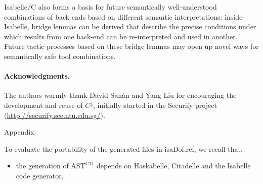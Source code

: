 \begin{isabellebody}
\begin{isamarkuptext}
Isabelle/C also forms a basis for future semantically well-understood combinations of back-ends 
based on different semantic interpretations: inside Isabelle, bridge lemmas can be derived 
that describe the precise conditions under which results from one back-end can be re-interpreted
and used in another. Future tactic processes based on these bridge lemmas may open up novel ways 
for semantically safe tool combinations.%
\end{isamarkuptext}\isamarkuptrue%
%
\paragraph*{Acknowledgments.}
\begin{isamarkuptext}%
The authors warmly thank David Sanán and Yang Liu for encouraging the development and reuse of
$C^\downarrow$, initially started in the Securify project \cite{DBLP:conf/tacas/SananZHZTL17}
(\url{http://securify.sce.ntu.edu.sg/}).
\end{isamarkuptext}\isamarkuptrue%
%
\begin{isamarkupsection*}%
[label = {appendix},type = {scholarly_paper.technical}, args={label = {appendix},type = {scholarly_paper.technical}, scholarly_paper.text_section.main_author = {@{docitem ''fred''}}, Isa_COL.text_element.level = {}, Isa_COL.text_element.referentiable = {False}, Isa_COL.text_element.variants = {{STR ''outline'', STR ''document''}}, scholarly_paper.text_section.fixme_list = {}, Isa_COL.text_element.level = {}, scholarly_paper.technical.definition_list = {}}]Appendix%
\end{isamarkupsection*}\isamarkuptrue%
%
\isadelimdocument
%
\endisadelimdocument
%
\isatagdocument
%
\isamarkuptrue%
%
\endisatagdocument
{\isafolddocument}%
%
\isadelimdocument
%
\endisadelimdocument
%
\begin{isamarkuptext}%
To evaluate the portability of the generated files in \csname isaDof.ref, we recall that:

%
\begin{itemize}%
\item the generation of $\text{AST}^{\text{C11}}$ depends on Haskabelle, Citadelle and the
Isabelle code generator,


\end{itemize}
\end{isamarkuptext}
\end{isabellebody}
